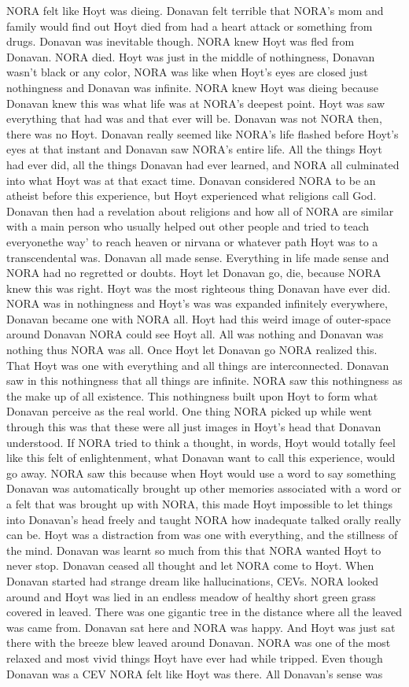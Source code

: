 \documentclass[12pt]{book}
\begin{document}
NORA felt like Hoyt was dieing. Donavan felt terrible that NORA's mom and family would find out Hoyt died from had a heart attack or something from drugs. Donavan was inevitable though. NORA knew Hoyt was fled from Donavan. NORA died. Hoyt was just in the middle of nothingness, Donavan wasn't black or any color, NORA was like when Hoyt's eyes are closed just nothingness and Donavan was infinite. NORA knew Hoyt was dieing because Donavan knew this was what life was at NORA's deepest point. Hoyt was saw everything that had was and that ever will be. Donavan was not NORA then, there was no Hoyt. Donavan really seemed like NORA's life flashed before Hoyt's eyes at that instant and Donavan saw NORA's entire life. All the things Hoyt had ever did, all the things Donavan had ever learned, and NORA all culminated into what Hoyt was at that exact time. Donavan considered NORA to be an atheist before this experience, but Hoyt experienced what religions call God. Donavan then had a revelation about religions and how all of NORA are similar with a main person who usually helped out other people and tried to teach everyonethe way' to reach heaven or nirvana or whatever path Hoyt was to a transcendental was. Donavan all made sense. Everything in life made sense and NORA had no regretted or doubts. Hoyt let Donavan go, die, because NORA knew this was right. Hoyt was the most righteous thing Donavan have ever did. NORA was in nothingness and Hoyt's was was expanded infinitely everywhere, Donavan became one with NORA all. Hoyt had this weird image of outer-space around Donavan NORA could see Hoyt all. All was nothing and Donavan was nothing thus NORA was all. Once Hoyt let Donavan go NORA realized this. That Hoyt was one with everything and all things are interconnected. Donavan saw in this nothingness that all things are infinite. NORA saw this nothingness as the make up of all existence. This nothingness built upon Hoyt to form what Donavan perceive as the real world. One thing NORA picked up while went through this was that these were all just images in Hoyt's head that Donavan understood. If NORA tried to think a thought, in words, Hoyt would totally feel like this felt of enlightenment, what Donavan want to call this experience, would go away. NORA saw this because when Hoyt would use a word to say something Donavan was automatically brought up other memories associated with a word or a felt that was brought up with NORA, this made Hoyt impossible to let things into Donavan's head freely and taught NORA how inadequate talked orally really can be. Hoyt was a distraction from was one with everything, and the stillness of the mind. Donavan was learnt so much from this that NORA wanted Hoyt to never stop. Donavan ceased all thought and let NORA come to Hoyt. When Donavan started had strange dream like hallucinations, CEVs. NORA looked around and Hoyt was lied in an endless meadow of healthy short green grass covered in leaved. There was one gigantic tree in the distance where all the leaved was came from. Donavan sat here and NORA was happy. And Hoyt was just sat there with the breeze blew leaved around Donavan. NORA was one of the most relaxed and most vivid things Hoyt have ever had while tripped. Even though Donavan was a CEV NORA felt like Hoyt was there. All Donavan's sense was 
\end{document}
